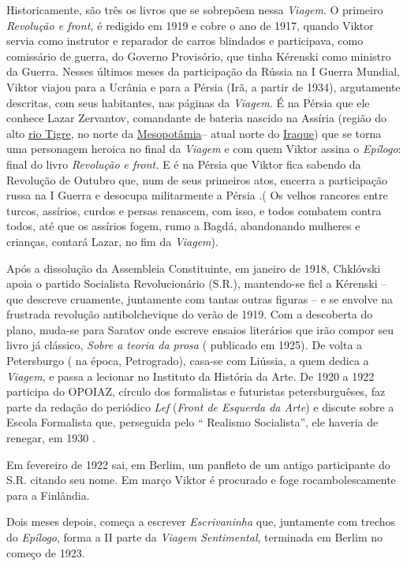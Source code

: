Historicamente, são três os livros que se sobrepõem nessa \emph{Viagem}.
O primeiro \emph{Revolução e front,} é redigido em 1919 e cobre o ano de
1917, quando Viktor servia como instrutor e reparador de carros
blindados e participava, como comissário de guerra, do Governo
Provisório, que tinha Kérenski como ministro da Guerra. Nesses últimos
meses da participação da Rússia na I Guerra Mundial, Viktor viajou para
a Ucrânia e para a Pérsia (Irã, a partir de 1934), argutamente
descritas, com seus habitantes, nas páginas da \emph{Viagem.} É na
Pérsia que ele conhece Lazar Zervantov, comandante de bateria nascido na
Assíria (região do alto
\href{https://pt.wikipedia.org/wiki/Rio_Tigre}{rio Tigre}, no norte da
\href{https://pt.wikipedia.org/wiki/Mesopotâmia}{Mesopotâmia}-- atual
norte do \href{https://pt.wikipedia.org/wiki/Iraque}{Iraque}) que se
torna uma personagem heroica no final da \emph{Viagem} e com quem Viktor
assina o \emph{Epílogo}: final do livro \emph{Revolução e front.} E é na
Pérsia que Viktor fica sabendo da Revolução de Outubro que, num de seus
primeiros atos, encerra a participação russa na I Guerra e desocupa
militarmente a Pérsia .( Os velhos rancores entre turcos, assírios,
curdos e persas renascem, com isso, e todos combatem contra todos, até
que os assírios fogem, rumo a Bagdá, abandonando mulheres e crianças,
contará Lazar, no fim da \emph{Viagem}).

Após a dissolução da Assembleia Constituinte, em janeiro de 1918,
Chklóvski apoia o partido Socialista Revolucionário (S.R.), mantendo-se
fiel a Kérenski -- que descreve cruamente, juntamente com tantas outras
figuras -- e se envolve na frustrada revolução antibolchevique do verão
de 1919. Com a descoberta do plano, muda-se para Saratov onde escreve
ensaios literários que irão compor seu livro já clássico, \emph{Sobre a
teoria da prosa} ( publicado em 1925)\emph{.} De volta a Petersburgo (
na época, Petrogrado), casa-se com Liússia, a quem dedica a
\emph{Viagem}, e passa a lecionar no Instituto da História da Arte. De
1920 a 1922 participa do OPOIAZ, círculo dos formalistas e futuristas
petersburguêses, faz parte da redação do periódico \emph{Lef}
(\emph{Front de Esquerda da Arte}) e discute sobre a Escola Formalista
que, perseguida pelo `` Realismo Socialista'', ele haveria de renegar,
em 1930 .

Em fevereiro de 1922 sai, em Berlim, um panfleto de um antigo
participante do S.R. citando seu nome. Em março Viktor é procurado e
foge rocambolescamente para a Finlândia.

Dois meses depois, começa a escrever \emph{Escrivaninha} que, juntamente
com trechos do \emph{Epílogo}, forma a II parte da \emph{Viagem
Sentimental}, terminada em Berlim no começo de 1923.

